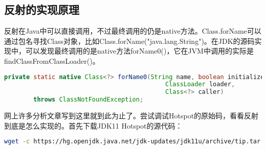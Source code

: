 \documentclass[../../../interview-questions.tex]{subfiles}
\begin{document}
\subsection{反射的实现原理}

反射在Java中可以直接调用，不过最终调用的仍是native方法。Class.forName可以通过包名寻找Class对象，比如Class.forName("java.lang.String")。在JDK的源码实现中，可以发现最终调用的是native方法forName0()，它在JVM中调用的实际是findClassFromClassLoader()。

\begin{lstlisting}[language=Java]
private static native Class<?> forName0(String name, boolean initialize,
                                            ClassLoader loader,
                                            Class<?> caller)
        throws ClassNotFoundException;
\end{lstlisting}

网上许多分析文章写到这里就到此为止了。尝试调试Hotspot的原始码，看看反射到底是怎么实现的。首先下载JDK11 Hotspot的源代码：

\begin{lstlisting}[language=Bash]
wget -c https://hg.openjdk.java.net/jdk-updates/jdk11u/archive/tip.tar.gz    
\end{lstlisting}
\end{document}

